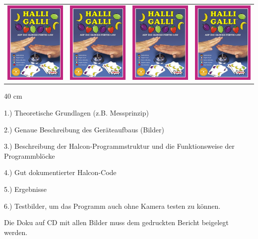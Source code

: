 \begin{center}
\begin{tabular}{cccc}
  \includegraphics[width=3cm]{Abbildungen/Cover} & \includegraphics[width=3cm]{Abbildungen/Cover} & \includegraphics[width=3cm]{Abbildungen/Cover} & \includegraphics[width=3cm]{Abbildungen/Cover} \\ 
\end{tabular}

\end{center}

40 cm 


1.) Theoretische Grundlagen (z.B. Messprinzip)

2.) Genaue Beschreibung des Geräteaufbaus (Bilder)

3.) Beschreibung der Halcon-Programmstruktur und die Funktionsweise der Programmblöcke

4.) Gut dokumentierter Halcon-Code 

5.) Ergebnisse 

6.) Testbilder, um das Programm auch ohne Kamera testen zu können.

Die Doku auf CD mit allen Bilder muss dem gedruckten Bericht beigelegt werden.

